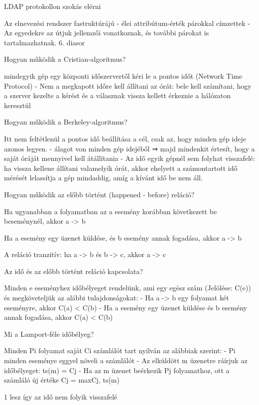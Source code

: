 \documentclass[12pt]{article}
\begin{document}
\begin{description}
    \item LDAP protokollon szokás elérni 
    \item Az elnevezési rendszer fastruktúrájú
        - élei attribútum-érték párokkal címzettek
        - Az egyedekre az útjuk jellemzői vonatkoznak, és további párokat is tartalmazhatnak.
        6. diasor
    \item  Hogyan működik a Cristian-algoritmus?
    \item mindegyik gép egy központi időszervertől kéri le a pontos időt (Network Time Protocol)	
        - Nem a megkapott időre kell állítani az órát: bele kell számítani, hogy 
        a szerver kezelte a kérést és a válasznak vissza kellett érkeznie a hálózaton keresztül
    \item  Hogyan működik a Berkeley-algoritmus?
    \item Itt nem feltétlenül a pontos idő beállítása a cél, csak az, hogy minden gép ideje azonos legyen.
        - álagot von minden gép idejéből
        ⇒ majd mindenkit értesít, hogy a saját óráját mennyivel kell átállítania
        - Az idő egyik gépnél sem folyhat visszafelé: ha vissza kellene állítani valamelyik órát,
        akkor ehelyett a számontartott idő mérését lelassítja a gép mindaddig, amíg a kívánt idő be nem áll.
    \item  Hogyan működik az előbb történt (happened - before) reláció?
    \item Ha ugyanabban a folyamatban az a esemény korábban következett be beseménynél, akkor a -> b
    \item Ha a esemény egy üzenet küldése, és b esemény annak fogadása, akkor a -> b
    \item A reláció tranzitív:  ha a -> b és b -> c, akkor a -> c
    \item  Az idő és az előbb történt reláció kapcsolata?
    \item Minden e eseményhez időbélyeget rendelünk, ami egy egész szám (Jelölése:  C(e)) és megköveteljük az alábbi tulajdonságokat:
        - Ha a -> b egy folyamat két eseményre, akkor C(a) < C(b)
        - Ha a esemény egy üzenet küldése és b esemény annak fogadása, akkor C(a) < C(b)
    \item  Mi a Lamport-féle időbélyeg?
    \item Minden Pi folyamat saját Ci számlálót tart nyilván az alábbiak szerint: 
        - Pi minden eseménye eggyel növeli a számlálót
        - Az elküldött m üzenetre ráírjuk az időbélyeget: ts(m) = Cj
        - Ha az m üzenet beérkezik Pj folyamathoz, ott a számláló új értéke Cj = max{Cj, ts(m)}\item1 lesz így az idő nem folyik visszafelé

\end{description}
\end{document}
